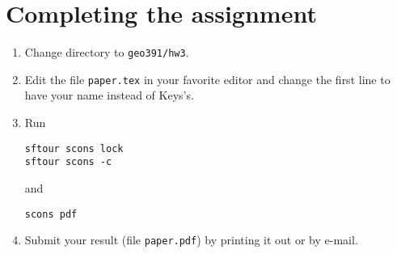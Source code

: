 \section{Completing the assignment}

\begin{enumerate}
\item Change directory to \verb#geo391/hw3#.
\item Edit the file \texttt{paper.tex} in your favorite editor and change the
  first line to have your name instead of Keys's.
\item Run
\begin{verbatim}
sftour scons lock
sftour scons -c
\end{verbatim}
and
\begin{verbatim}
scons pdf
\end{verbatim}
\item Submit your result (file \texttt{paper.pdf}) by printing it out
  or by e-mail.
\end{enumerate}

\nocite{keys}
\nocite{youla}



